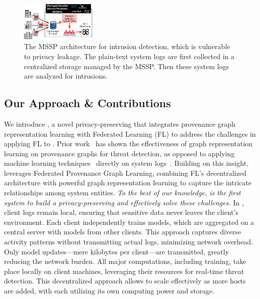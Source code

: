 \begin{figure}[t!]
  \centering
  \includegraphics[width=0.32\textwidth]{fig/mssp.pdf}
  \caption{The MSSP architecture for intrusion detection, which is vulnerable to privacy leakage. The plain-text system logs are first collected in a centralized storage managed by the MSSP. Then these system logs are analyzed for intrusions.}
  \label{mssp}
  \vspace{-4ex}
\end{figure}

\subsection{Our Approach \& Contributions}


We introduce \Sys, a novel privacy-preserving \pids that integrates provenance graph representation learning with Federated Learning (FL) to address the challenges in applying FL to \pids. Prior work~\cite{wang2022threatrace} has shown the effectiveness of graph representation learning on provenance graphs for threat detection, as opposed to applying machine learning techniques~\cite{chowdhary2020natural, goodfellow2020generative} directly on system logs~\cite{deeplog2017, xia2019loggan}. Building on this insight, \Sys leverages Federated Provenance Graph Learning, combining FL’s decentralized architecture with powerful graph representation learning to capture the intricate relationships among system entities. {\it To the best of our knowledge, \Sys is the first system to build a privacy-preserving \pids and effectively solve these challenges.} In \Sys, client logs remain local, ensuring that sensitive data never leaves the client's environment. Each client independently trains \gnnshort models, which are aggregated on a central server with models from other clients. This approach captures diverse activity patterns without transmitting actual logs, minimizing network overhead. Only model updates—mere kilobytes per client—are transmitted, greatly reducing the network burden. All major computations, including training, take place locally on client machines, leveraging their resources for real-time threat detection. This decentralized approach allows \Sys to scale effectively as more hosts are added, with each utilizing its own computing power and storage.

